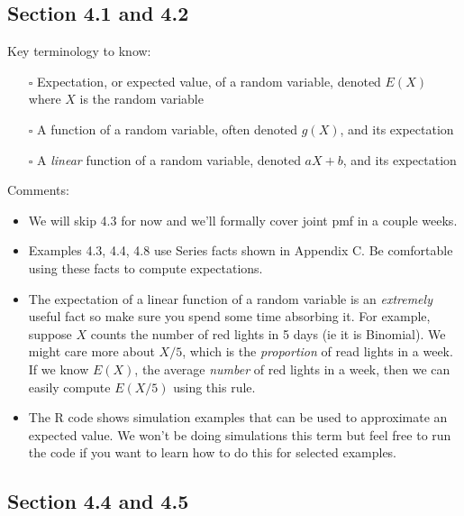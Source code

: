 \documentclass[
  letterpaper,
]{scrbook}
\providecommand{\tightlist}{%
  \setlength{\itemsep}{0pt}\setlength{\parskip}{0pt}}\usepackage{longtable,booktabs,array}
\begin{document}
\subsection*{Section 4.1 and 4.2}\label{section-4.1-and-4.2}

Key terminology to know:

\begin{itemize}
\tightlist
\item[$\square$]
  Expectation, or expected value, of a random variable, denoted \(E(X)\)
  where \(X\) is the random variable
\item[$\square$]
  A function of a random variable, often denoted \(g(X)\), and its
  expectation
\item[$\square$]
  A \emph{linear} function of a random variable, denoted \(aX+b\), and
  its expectation
\end{itemize}

Comments:

\begin{itemize}
\tightlist
\item
  We will skip 4.3 for now and we'll formally cover joint pmf in a
  couple weeks.
\item
  Examples 4.3, 4.4, 4.8 use Series facts shown in Appendix C. Be
  comfortable using these facts to compute expectations.
\item
  The expectation of a linear function of a random variable is an
  \emph{extremely} useful fact so make sure you spend some time
  absorbing it. For example, suppose \(X\) counts the number of red
  lights in 5 days (ie it is Binomial). We might care more about
  \(X/5\), which is the \emph{proportion} of read lights in a week. If
  we know \(E(X)\), the average \emph{number} of red lights in a week,
  then we can easily compute \(E(X/5)\) using this rule.
\item
  The R code shows simulation examples that can be used to approximate
  an expected value. We won't be doing simulations this term but feel
  free to run the code if you want to learn how to do this for selected
  examples.
\end{itemize}

\subsection*{Section 4.4 and 4.5}\label{section-4.4-and-4.5}
\end{document}
